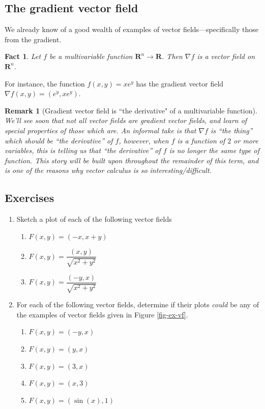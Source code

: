 \documentclass[12pt]{article}
\numberwithin{equation}{subsection}
\numberwithin{figure}{subsection}
\newtheorem{fact}[subsection]{Fact}
\theoremstyle{note}
\newtheorem{remark}[subsection]{Remark}
\begin{document}
{\subsection{The gradient vector field}
We already know of a good wealth of examples of vector fields---specifically those from the gradient. 

\begin{fact} Let $f$ be a multivariable function $\mathbf{R}^n\to \mathbf{R}$. Then $\nabla f$ is a vector field on $\mathbf{R}^n$. 
\end{fact}

For instance, the function $f(x,y)=xe^y$ has the gradient vector field $\nabla f (x,y)=(e^y, xe^y)$. 

\begin{remark}[Gradient vector field is ``the derivative" of a multivariable function]We'll see soon that not all vector fields are gradient vector fields, and learn of special properties of those which are. An informal take is that $\nabla f$ is ``the thing'' which should be ``the derivative'' of $f$, however, when $f$ is a function of $2$ or more variables, this is telling us that ``the derivative'' of $f$ is no longer the same type of function. This story will be built upon throughout the remainder of this term, and is one of the reasons why vector calculus is so interesting/difficult.\end{remark}

\subsection{Exercises}

\begin{enumerate}[label=\arabic*.]
\item Sketch a plot of each of the following vector fields

\begin{enumerate}
	\item $F(x,y)=(-x, x+y)$
	\item $F(x,y)=\dfrac{(x,y)}{\sqrt{x^2+y^2}}$
	\item $F(x,y)=\dfrac{(-y,x)}{\sqrt{x^2+y^2}}$
\end{enumerate}

\item For each of the following vector fields, determine if their plots \textit{could} be any of the examples of vector fields given in Figure \ref{fig-ex-vf}.
\begin{enumerate}
	\item $F(x,y)=(-y,x)$
	\item $F(x,y)=(y,x)$
	\item $F(x,y)=(3,x)$
	\item $F(x,y)=(x,3)$
	\item $F(x,y)=(\sin(x),1)$
\end{enumerate}


\end{enumerate}}
\end{document}
